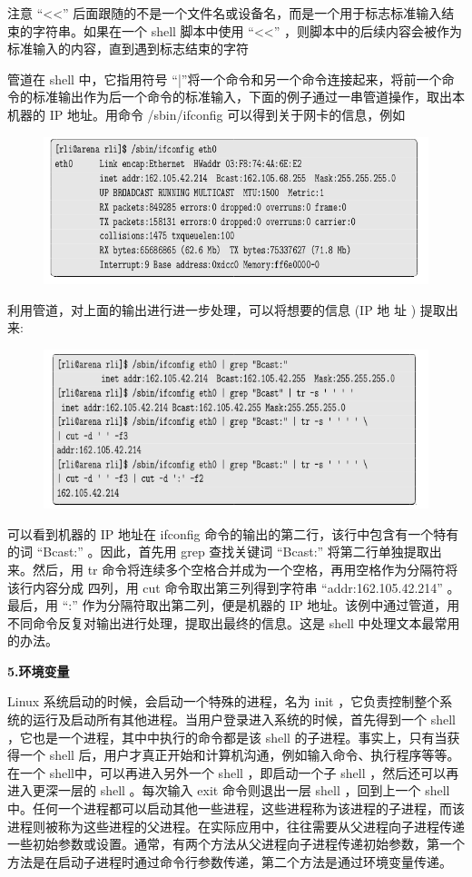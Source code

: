 \documentclass[12pt，a4paper]{article}
\numberwithin{equation}{section}
\begin{document}
注意 “<<” 后面跟随的不是一个文件名或设备名，而是一个用于标志标准输入结束的字符串。如果在一个 shell 脚本中使用 “<<” ，则脚本中的后续内容会被作为标准输入的内容，直到遇到标志结束的字符

管道在 shell 中，它指用符号 “|”将一个命令和另一个命令连接起来，将前一个命令的标准输出作为后一个命令的标准输入，下面的例子通过一串管道操作，取出本机器的 IP 地址。用命令 /sbin/ifconfig 可以得到关于网卡的信息，例如
\begin{figure}[H]
\centering
\includegraphics[scale=0.6]{./figures/236.png}
\end{figure}
利用管道，对上面的输出进行进一步处理，可以将想要的信息 (IP 地
址 ) 提取出来:
\begin{figure}[H]
\centering
\includegraphics[scale=0.6]{./figures/277.png}
\end{figure}
可以看到机器的 IP 地址在 ifconfig 命令的输出的第二行，该行中包含有一个特有的词 “Bcast:” 。因此，首先用 grep 查找关键词 “Bcast:” 将第二行单独提取出来。然后，用 tr 命令将连续多个空格合并成为一个空格，再用空格作为分隔符将该行内容分成
四列，用 cut 命令取出第三列得到字符串 “addr:162.105.42.214” 。最后，用 “:” 作为分隔符取出第二列，便是机器的 IP 地址。该例中通过管道，用不同命令反复对输出进行处理，提取出最终的信息。这是 shell 中处理文本最常用的办法。

\textbf{5.环境变量}

Linux 系统启动的时候，会启动一个特殊的进程，名为 init ，它负责控制整个系统的运行及启动所有其他进程。当用户登录进入系统的时候，首先得到一个 shell ，它也是一个进程，其中中执行的命令都是该 shell 的子进程。事实上，只有当获得一个 shell 后，用户才真正开始和计算机沟通，例如输入命令、执行程序等等。在一个 shell中，可以再进入另外一个 shell ，即启动一个子 shell ，然后还可以再进入更深一层的 shell 。每次输入 exit 命令则退出一层 shell ，回到上一个 shell 中。任何一个进程都可以启动其他一些进程，这些进程称为该进程的子进程，而该进程则被称为这些进程的父进程。在实际应用中，往往需要从父进程向子进程传递一些初始参数或设置。通常，有两个方法从父进程向子进程传递初始参数，第一个方法是在启动子进程时通过命令行参数传递，第二个方法是通过环境变量传递。
\end{document}
